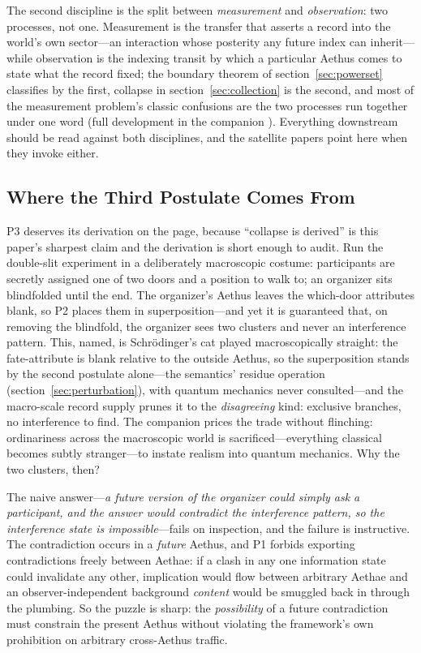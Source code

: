 \documentclass[11pt]{article}
\theoremstyle{definition}
\newcommand{\Aethus}{Aethus}
\begin{document}
The second discipline is the split between \emph{measurement} and \emph{observation}: two processes, not one. Measurement is the transfer that asserts a record into the world's own sector---an interaction whose posterity any future index can inherit---while observation is the indexing transit by which a particular \Aethus{} comes to state what the record fixed; the boundary theorem of section~\ref{sec:powerset} classifies by the first, collapse in section~\ref{sec:collection} is the second, and most of the measurement problem's classic confusions are the two processes run together under one word (full development in the companion \cite{Aethus}). Everything downstream should be read against both disciplines, and the satellite papers point here when they invoke either.

\subsection{Where the Third Postulate Comes From}\label{sec:derivation}

P3 deserves its derivation on the page, because ``collapse is derived'' is this paper's sharpest claim and the derivation is short enough to audit. Run the double-slit experiment in a deliberately macroscopic costume: participants are secretly assigned one of two doors and a position to walk to; an organizer sits blindfolded until the end. The organizer's \Aethus{} leaves the which-door attributes blank, so P2 places them in superposition---and yet it is guaranteed that, on removing the blindfold, the organizer sees two clusters and never an interference pattern. This, named, is Schr\"odinger's cat played macroscopically straight: the fate-attribute is blank relative to the outside \Aethus{}, so the superposition stands by the second postulate alone---the semantics' residue operation (section~\ref{sec:perturbation}), with quantum mechanics never consulted---and the macro-scale record supply prunes it to the \emph{disagreeing} kind: exclusive branches, no interference to find. The companion prices the trade without flinching: ordinariness across the macroscopic world is sacrificed---everything classical becomes subtly stranger---to instate realism into quantum mechanics. Why the two clusters, then?

The naive answer---\emph{a future version of the organizer could simply ask a participant, and the answer would contradict the interference pattern, so the interference state is impossible}---fails on inspection, and the failure is instructive. The contradiction occurs in a \emph{future} \Aethus, and P1 forbids exporting contradictions freely between Aethae: if a clash in any one information state could invalidate any other, implication would flow between arbitrary Aethae and an observer-independent background \emph{content} would be smuggled back in through the plumbing. So the puzzle is sharp: the \emph{possibility} of a future contradiction must constrain the present \Aethus{} without violating the framework's own prohibition on arbitrary cross-\Aethus{} traffic.
\end{document}
